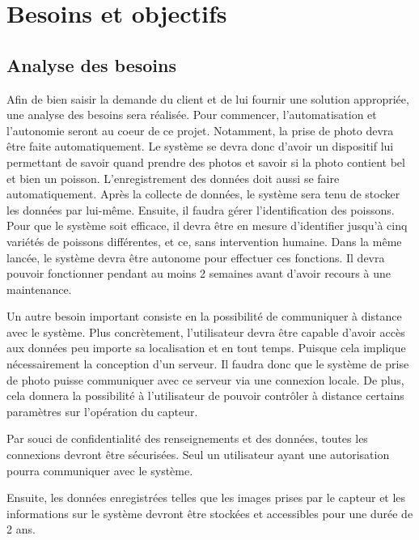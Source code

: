 
%
%

\chapter{Besoins et objectifs}
\label{s:objectifs}

\section{Analyse des besoins}

Afin de bien saisir la demande du client et de lui fournir une solution appropriée, une analyse des besoins sera réalisée. Pour commencer, l'automatisation et l'autonomie seront au coeur de ce projet. Notamment, la prise de photo devra être faite automatiquement. Le système se devra donc d'avoir un dispositif lui permettant de savoir quand prendre des photos et savoir si la photo contient bel et bien un poisson. L'enregistrement des données doit aussi se faire automatiquement. Après la collecte de données, le système sera tenu de stocker les données par lui-même. Ensuite, il faudra gérer l'identification des poissons. Pour que le système soit efficace, il devra être en mesure d'identifier jusqu'à cinq variétés de poissons différentes, et ce, sans intervention humaine. Dans la même lancée, le système devra être autonome pour effectuer ces fonctions. Il devra pouvoir fonctionner pendant au moins 2 semaines avant d'avoir recours à une maintenance.

Un autre besoin important consiste en la possibilité de communiquer à distance avec le système. Plus concrètement, l'utilisateur devra être capable d'avoir accès aux données peu importe sa localisation et en tout temps. Puisque cela implique nécessairement la conception d'un serveur. Il faudra donc que le système de prise de photo puisse communiquer avec ce serveur via une connexion locale. De plus, cela donnera la possibilité à l'utilisateur de pouvoir contrôler à distance certains paramètres sur l'opération du capteur.

Par souci de confidentialité des renseignements et des données, toutes les connexions devront être sécurisées. Seul un utilisateur ayant une autorisation pourra communiquer avec le système.

Ensuite, les données enregistrées telles que les images prises par le capteur et les informations sur le système devront être stockées et accessibles pour une durée de 2 ans.

